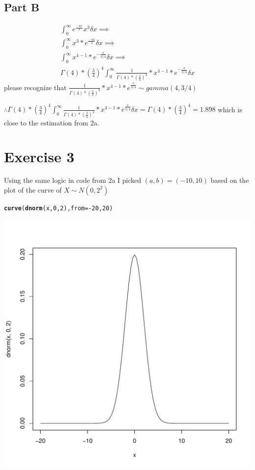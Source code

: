 \documentclass{article}\usepackage[]{graphicx}\usepackage[]{color}
\makeatletter
\newcommand{\hlnum}[1]{\textcolor[rgb]{0.686,0.059,0.569}{#1}}%
\newcommand{\hlopt}[1]{\textcolor[rgb]{0,0,0}{#1}}%
\newcommand{\hlstd}[1]{\textcolor[rgb]{0.345,0.345,0.345}{#1}}%
\newcommand{\hlkwc}[1]{\textcolor[rgb]{0.333,0.667,0.333}{#1}}%
\newcommand{\hlkwd}[1]{\textcolor[rgb]{0.737,0.353,0.396}{\textbf{#1}}}%
\newenvironment{kframe}{%
 \def\at@end@of@kframe{}%
 \ifinner\ifhmode%
  \def\at@end@of@kframe{\end{minipage}}%
  \begin{minipage}{\columnwidth}%
 \fi\fi%
 \def\FrameCommand##1{\hskip\@totalleftmargin \hskip-\fboxsep
 \colorbox{shadecolor}{##1}\hskip-\fboxsep
     \hskip-\linewidth \hskip-\@totalleftmargin \hskip\columnwidth}%
 \MakeFramed {\advance\hsize-\width
   \@totalleftmargin\z@ \linewidth\hsize
   \@setminipage}}%
 {\par\unskip\endMakeFramed%
 \at@end@of@kframe}
\newenvironment{knitrout}{}{} %
\makeatother
\begin{document}
\subsection*{Part B}
\begin{equation}
\begin{split}
\int_{0}^{\infty}e^{\frac{-4x}{3}}x^3\delta x \implies \\
\int_{0}^{\infty}x^3*e^{\frac{-4x}{3}}\delta x \implies \\
\int_{0}^{\infty}x^{4-1}*e^{-\frac{x}{3/4}}\delta x \implies \\
\Gamma(4)*(\frac{3}{4})^4\int_{0}^{\infty}\frac{1}{\Gamma(4)*(\frac{3}{4})^4}*x^{4-1}*e^{-\frac{x}{3/4}}\delta x
\end{split}
\end{equation}
please recognize that $\frac{1}{\Gamma(4)*(\frac{3}{4})^4}*x^{4-1}*e^{\frac{x}{3/4}}\sim gamma(4,3/4)$

$\therefore \Gamma(4)*(\frac{3}{4})^4\int_{0}^{\infty}\frac{1}{\Gamma(4)*(\frac{3}{4})^4}*x^{4-1}*e^{\frac{x}{3/4}}\delta x = \Gamma(4)*(\frac{3}{4})^4 = 1.898$ which is close to the estimation from 2a.
\section*{Exercise 3}
Using the same logic in code from 2a
I picked $(a,b) = (-10,10)$ based on the plot of the curve of $X\sim N(0,2^2)$
\begin{knitrout}
\color{fgcolor}\begin{kframe}
\begin{alltt}
\hlkwd{curve}\hlstd{(}\hlkwd{dnorm}\hlstd{(x,}\hlnum{0}\hlstd{,}\hlnum{2}\hlstd{),} \hlkwc{from} \hlstd{=} \hlopt{-}\hlnum{20}\hlstd{,} \hlnum{20}\hlstd{)}
\end{alltt}
\end{kframe}
\includegraphics[width=0.60\linewidth]{figure/unnamed-chunk-5-1} 

\end{knitrout}
\end{document}
